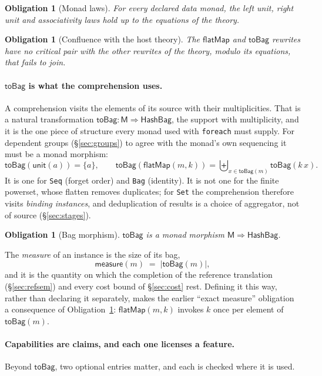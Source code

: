 \documentclass[11pt]{article}
\theoremstyle{branddef}
\newtheorem{obligation}[definition]{Obligation}
\theoremstyle{brandplain}
\theoremstyle{brandrem}
\newcommand{\M}{\mathsf{M}}
\newcommand{\unit}{\mathsf{unit}}
\newcommand{\bind}{\mathsf{flatMap}}
\newcommand{\meas}{\mathsf{measure}}
\newcommand{\fe}{\texttt{foreach}}
\begin{document}
\begin{obligation}[Monad laws]
For every declared data monad, the left unit, right unit and associativity
laws hold up to the equations of the theory.
\end{obligation}

\begin{obligation}[Confluence with the host theory]
\label{obl:confluence}
The \(\bind\) and \(\mathsf{toBag}\) rewrites have no critical pair with the
other rewrites of the theory, modulo its equations, that fails to join.
\end{obligation}

\paragraph{\(\mathsf{toBag}\) is what the comprehension uses.} A comprehension
visits the elements of its source with their multiplicities. That is a natural
transformation \(\mathsf{toBag} : \M \Rightarrow \mathsf{HashBag}\), the
support with multiplicity, and it is the one piece of structure every monad
used with \fe{} must supply. For dependent groups (\S\ref{sec:groups}) to agree
with the monad's own sequencing it must be a monad morphism:
\[
\mathsf{toBag}(\unit(a)) = \{a\},
\qquad
\mathsf{toBag}(\bind(m, k)) = \textstyle\biguplus_{x \in \mathsf{toBag}(m)} \mathsf{toBag}(k\,x).
\]
It is one for \texttt{Seq} (forget order) and \texttt{Bag} (identity). It is
not one for the finite powerset, whose flatten removes duplicates; for
\texttt{Set} the comprehension therefore visits \emph{binding instances}, and
deduplication of results is a choice of aggregator, not of source
(\S\ref{sec:stages}).

\begin{obligation}[Bag morphism]
\label{obl:tobag}
\(\mathsf{toBag}\) is a monad morphism \(\M\Rightarrow\mathsf{HashBag}\).
\end{obligation}

The \emph{measure} of an instance is the size of its bag,
\[
\meas(m) \;=\; |\mathsf{toBag}(m)|,
\]
and it is the quantity on which the completion of the reference translation
(\S\ref{sec:refsem}) and every cost bound of \S\ref{sec:cost} rest. Defining it
this way, rather than declaring it separately, makes the earlier ``exact
measure'' obligation a consequence of Obligation~\ref{obl:tobag}: \(\bind(m,
k)\) invokes \(k\) once per element of \(\mathsf{toBag}(m)\).

\paragraph{Capabilities are claims, and each one licenses a feature.} Beyond
\(\mathsf{toBag}\), two optional entries matter, and each is checked where it is
used.
\end{document}

